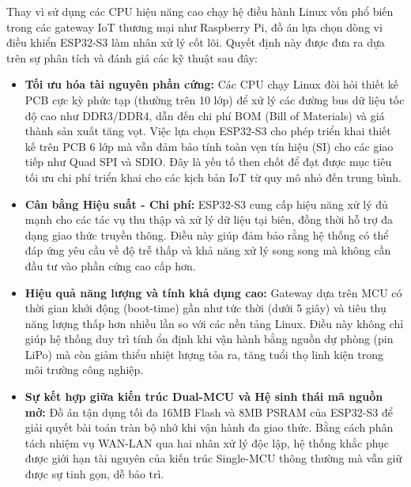                 Thay vì sử dụng các CPU hiệu năng cao chạy hệ điều hành Linux vốn phổ biến trong các gateway IoT thương mại như Raspberry Pi, đồ án lựa chọn dòng vi điều khiển ESP32-S3 làm nhân xử lý cốt lõi. Quyết định này được đưa ra dựa trên sự phân tích và đánh giá các kỹ thuật sau đây:
                \begin{itemize}
                    \item \textbf{Tối ưu hóa tài nguyên phần cứng:} Các CPU chạy Linux đòi hỏi thiết kế PCB cực kỳ phức tạp (thường trên 10 lớp) để xử lý các đường bus dữ liệu tốc độ cao như DDR3/DDR4, dẫn đến chi phí BOM (Bill of Materials) và giá thành sản xuất tăng vọt. Việc lựa chọn ESP32-S3 cho phép triển khai thiết kế trên PCB 6 lớp mà vẫn đảm bảo tính toàn vẹn tín hiệu (SI) cho các giao tiếp như Quad SPI và SDIO. Đây là yếu tố then chốt để đạt được mục tiêu tối ưu chi phí triển khai cho các kịch bản IoT từ quy mô nhỏ đến trung bình.
                    \item \textbf{Cân bằng Hiệu suất - Chi phí:} ESP32-S3 cung cấp hiệu năng xử lý đủ mạnh cho các tác vụ thu thập và xử lý dữ liệu tại biên, đồng thời hỗ trợ đa dạng giao thức truyền thông. Điều này giúp đảm bảo rằng hệ thống có thể đáp ứng yêu cầu về độ trễ thấp và khả năng xử lý song song mà không cần đầu tư vào phần cứng cao cấp hơn.
                    \item \textbf{Hiệu quả năng lượng và tính khả dụng cao:} Gateway dựa trên MCU có thời gian khởi động (boot-time) gần như tức thời (dưới 5 giây) và tiêu thụ năng lượng thấp hơn nhiều lần so với các nền tảng Linux. Điều này không chỉ giúp hệ thống duy trì tính ổn định khi vận hành bằng nguồn dự phòng (pin LiPo) mà còn giảm thiểu nhiệt lượng tỏa ra, tăng tuổi thọ linh kiện trong môi trường công nghiệp.
                    \item \textbf{Sự kết hợp giữa kiến trúc Dual-MCU và Hệ sinh thái mã nguồn mở:} Đồ án tận dụng tối đa 16MB Flash và 8MB PSRAM của ESP32-S3 để giải quyết bài toán tràn bộ nhớ khi vận hành đa giao thức. Bằng cách phân tách nhiệm vụ WAN-LAN qua hai nhân xử lý độc lập, hệ thống khắc phục được giới hạn tài nguyên của kiến trúc Single-MCU thông thường mà vẫn giữ được sự tinh gọn, dễ bảo trì.
                \end{itemize}

